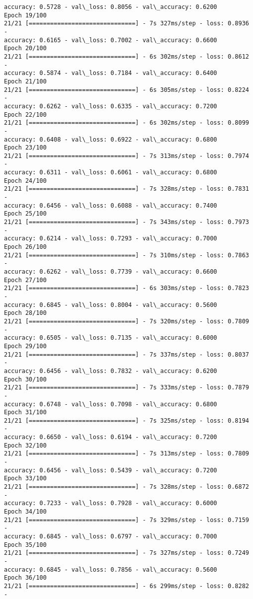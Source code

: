\documentclass[11pt]{article}
\begin{document}
\begin{Verbatim}[commandchars=\\\{\}]
accuracy: 0.5728 - val\_loss: 0.8056 - val\_accuracy: 0.6200
Epoch 19/100
21/21 [==============================] - 7s 327ms/step - loss: 0.8936 -
accuracy: 0.6165 - val\_loss: 0.7002 - val\_accuracy: 0.6600
Epoch 20/100
21/21 [==============================] - 6s 302ms/step - loss: 0.8612 -
accuracy: 0.5874 - val\_loss: 0.7184 - val\_accuracy: 0.6400
Epoch 21/100
21/21 [==============================] - 6s 305ms/step - loss: 0.8224 -
accuracy: 0.6262 - val\_loss: 0.6335 - val\_accuracy: 0.7200
Epoch 22/100
21/21 [==============================] - 6s 302ms/step - loss: 0.8099 -
accuracy: 0.6408 - val\_loss: 0.6922 - val\_accuracy: 0.6800
Epoch 23/100
21/21 [==============================] - 7s 313ms/step - loss: 0.7974 -
accuracy: 0.6311 - val\_loss: 0.6061 - val\_accuracy: 0.6800
Epoch 24/100
21/21 [==============================] - 7s 328ms/step - loss: 0.7831 -
accuracy: 0.6456 - val\_loss: 0.6088 - val\_accuracy: 0.7400
Epoch 25/100
21/21 [==============================] - 7s 343ms/step - loss: 0.7973 -
accuracy: 0.6214 - val\_loss: 0.7293 - val\_accuracy: 0.7000
Epoch 26/100
21/21 [==============================] - 7s 310ms/step - loss: 0.7863 -
accuracy: 0.6262 - val\_loss: 0.7739 - val\_accuracy: 0.6600
Epoch 27/100
21/21 [==============================] - 6s 303ms/step - loss: 0.7823 -
accuracy: 0.6845 - val\_loss: 0.8004 - val\_accuracy: 0.5600
Epoch 28/100
21/21 [==============================] - 7s 320ms/step - loss: 0.7809 -
accuracy: 0.6505 - val\_loss: 0.7135 - val\_accuracy: 0.6000
Epoch 29/100
21/21 [==============================] - 7s 337ms/step - loss: 0.8037 -
accuracy: 0.6456 - val\_loss: 0.7832 - val\_accuracy: 0.6200
Epoch 30/100
21/21 [==============================] - 7s 333ms/step - loss: 0.7879 -
accuracy: 0.6748 - val\_loss: 0.7098 - val\_accuracy: 0.6800
Epoch 31/100
21/21 [==============================] - 7s 325ms/step - loss: 0.8194 -
accuracy: 0.6650 - val\_loss: 0.6194 - val\_accuracy: 0.7200
Epoch 32/100
21/21 [==============================] - 7s 313ms/step - loss: 0.7809 -
accuracy: 0.6456 - val\_loss: 0.5439 - val\_accuracy: 0.7200
Epoch 33/100
21/21 [==============================] - 7s 328ms/step - loss: 0.6872 -
accuracy: 0.7233 - val\_loss: 0.7928 - val\_accuracy: 0.6000
Epoch 34/100
21/21 [==============================] - 7s 329ms/step - loss: 0.7159 -
accuracy: 0.6845 - val\_loss: 0.6797 - val\_accuracy: 0.7000
Epoch 35/100
21/21 [==============================] - 7s 327ms/step - loss: 0.7249 -
accuracy: 0.6845 - val\_loss: 0.7856 - val\_accuracy: 0.5600
Epoch 36/100
21/21 [==============================] - 6s 299ms/step - loss: 0.8282 -

\end{Verbatim}
\end{document}
